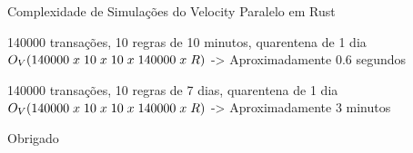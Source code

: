 \documentclass[10pt]{beamer}
\begin{document}
\begin{frame}[fragile]{Complexidade de Simulações do Velocity Paralelo em Rust}	
	\begin{block}{140000 transações, 10 regras de 10 minutos, quarentena de 1 dia}
		\textcolor{purplevs}{$O_V(140000\hspace{0.1cm}x\hspace{0.1cm}10\hspace{0.1cm}x\hspace{0.1cm}10\hspace{0.1cm}x\hspace{0.1cm}140000\hspace{0.1cm}x\hspace{0.1cm}R)$} -> \textcolor{purplevs}{Aproximadamente 0.6 segundos}
	\end{block}	
	
	
	\vspace{0.5cm}
	
	\begin{block}{140000 transações, 10 regras de 7 dias, quarentena de 1 dia}
		\textcolor{purplevs}{$O_V(140000\hspace{0.1cm}x\hspace{0.1cm}10\hspace{0.1cm}x\hspace{0.1cm}10\hspace{0.1cm}x\hspace{0.1cm}140000\hspace{0.1cm}x\hspace{0.1cm}R)$} -> \textcolor{purplevs}{ Aproximadamente 3 minutos}
	\end{block}		
\end{frame}

\begin{frame}[standout]
  Obrigado
\end{frame}
\end{document}
